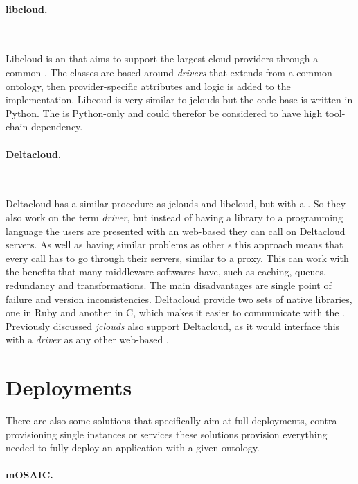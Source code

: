\paragraph{libcloud.}~\cite{libcloud}

Libcloud is an  that aims to support the largest cloud providers through a common . 
The classes are based around \emph{drivers} that extends from a common ontology, 
then provider-specific attributes and logic is added to the implementation.
Libcoud is very similar to jclouds but the  code base is written in Python. 
The  is Python-only and could therefor be considered to have high tool-chain dependency.

\paragraph{Deltacloud.}~\cite{deltacloud}

Deltacloud has a similar procedure as jclouds and libcloud, but with a  . 
So they also work on the term \emph{driver}, but instead of having a library to a 
programming language the users are presented with an web-based  they can call
on Deltacloud servers. 
As well as having similar problems as other s this approach means 
that every call has to go through their servers, similar to a proxy. 
This can work with the benefits that many middleware softwares have, such as caching, queues, 
redundancy and transformations.
The main disadvantages are single point of failure and version inconsistencies.
Deltacloud provide two sets of native libraries, one in Ruby and another in C, which
makes it easier to communicate with the  .
Previously discussed \emph{jclouds} also support Deltacloud, as it would interface this
with a \emph{driver} as any other web-based .

\section{Deployments}

There are also some solutions that specifically aim at full deployments,
contra provisioning single instances or services these solutions
provision everything needed to fully deploy an application with a given ontology.

\paragraph{mOSAIC.}~\cite{portable:petcu12} 

